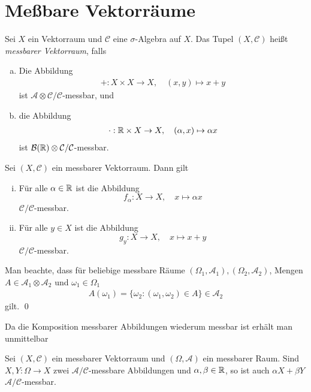 \section{Meßbare Vektorräume}
\begin{mydef}
    Sei $X$ ein Vektorraum und $\mathcal{C}$ eine $\sigma$-Algebra auf $X$. Das Tupel $(X, \mathcal{C})$ heißt \textit{messbarer Vektorraum}, falls
    \begin{enumerate}[(a)]
        \item Die Abbildung 
        \begin{align*}
            + : X \times X \to X, \quad (x,y) \mapsto x + y
        \end{align*}
        ist $\mathcal{A}\otimes \mathcal{C}/\mathcal{C}$-messbar, und
        \item die Abbildung 
        \begin{align*}
            \cdot : \mathbb{R} \times X \to X, \quad  (\alpha, x) \mapsto \alpha x
        \end{align*}
        ist $\mathcal{B}(\mathbb{R}) \otimes \mathcal{C}/\mathcal{C}$-messbar. 
    \end{enumerate}
\end{mydef}

\begin{remark}
    Sei $(X, \mathcal{C})$ ein messbarer Vektorraum. Dann gilt
    \begin{enumerate}[(i)]
        \item Für alle $\alpha \in \mathbb{R}$ ist die Abbildung 
            $$f_{\alpha}: X \to X, \quad x \mapsto \alpha x$$
        $\mathcal{C}/\mathcal{C}$-messbar. 
        \item Für alle $y \in X$ ist die Abbildung 
            $$g_y: X \to X, \quad x \mapsto x + y$$
        $\mathcal{C}/\mathcal{C}$-messbar.
    \end{enumerate}
\end{remark}
\begin{proof*}
    Man beachte, dass für beliebige  messbare Räume $(\Omega_1, \mathcal{A}_1), (\Omega_2, \mathcal{A}_2)$, Mengen $A \in \mathcal{A}_1 \otimes \mathcal{A}_2$ und $\omega_1 \in \Omega_1$
    \begin{align*}
    A(\omega_1) = \{ \omega_2 : (\omega_1,\omega_2) \in A \} \in \mathcal{A}_2
    \end{align*}
    gilt. \qed
\end{proof*}
Da die Komposition messbarer Abbildungen wiederum messbar ist erhält man unmittelbar
\begin{proposition}
    Sei $(X, \mathcal{C})$ ein messbarer Vektorraum und $(\Omega, \mathcal{A})$ ein messbarer Raum. 
    Sind $X,Y: \Omega \to X$ zwei $\mathcal{A}/\mathcal{C}$-messbare Abbildungen und $\alpha, \beta \in \mathbb{R}$, so ist auch $\alpha X + \beta Y$ $\mathcal{A}/\mathcal{C}$-messbar. 
\end{proposition}

